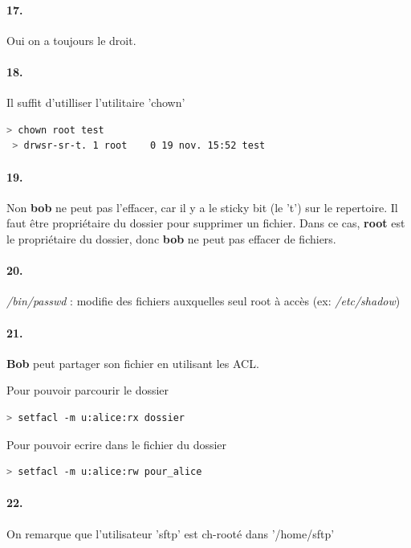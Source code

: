 \documentclass[10pt]{article}
\begin{document}
        \paragraph{17.}
        Oui on a toujours le droit.
        
        \paragraph{18.} Il suffit d'utilliser l'utilitaire 'chown'
 \begin{lstlisting}[language=bash]
 > chown root test
 > drwsr-sr-t. 1 root    0 19 nov. 15:52 test
\end{lstlisting}

        \paragraph{19.}
        Non \textbf{bob} ne peut pas l'effacer, car il y a le sticky bit (le 't') sur le repertoire.
        Il faut être propriétaire du dossier pour supprimer un fichier.
        Dans ce cas, \textbf{root} est le propriétaire du dossier, donc \textbf{bob} ne peut pas effacer de fichiers.
        
        \paragraph{20.}
        \textit{/bin/passwd} : modifie des fichiers auxquelles seul root à accès (ex: \textit{/etc/shadow})
        
        \paragraph{21.}
        \textbf{Bob} peut partager son fichier en utilisant les ACL.
        
        Pour pouvoir parcourir le dossier
\begin{lstlisting}[language=bash]
> setfacl -m u:alice:rx dossier
\end{lstlisting}

Pour pouvoir ecrire dans le fichier du dossier
\begin{lstlisting}[language=bash]
> setfacl -m u:alice:rw pour_alice
\end{lstlisting}
 
 \paragraph{22.}
 On remarque que l'utilisateur 'sftp' est ch-rooté dans '/home/sftp'
\end{document}
